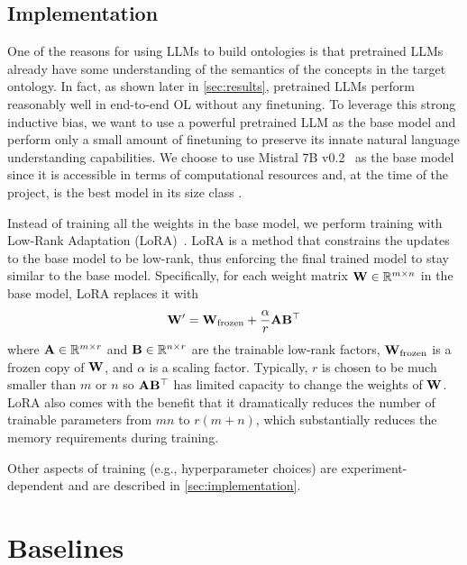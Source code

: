 \subsection{Implementation}

One of the reasons for using LLMs to build ontologies is that pretrained LLMs already have some understanding of the semantics of the concepts in the target ontology. In fact, as shown later in \cref{sec:results}, pretrained LLMs perform reasonably well in end-to-end OL without any finetuning. To leverage this strong inductive bias, we want to use a powerful pretrained LLM as the base model and perform only a small amount of finetuning to preserve its innate natural language understanding capabilities. We choose to use Mistral 7B v0.2~\cite{jiang2023mistral} as the base model since it is accessible in terms of computational resources and, at the time of the project, is the best model in its size class \cite{chiang2024chatbot}.

Instead of training all the weights in the base model, we perform training with Low-Rank Adaptation (LoRA)~\cite{hu2021lora}. LoRA is a method that constrains the updates to the base model to be low-rank, thus enforcing the final trained model to stay similar to the base model. Specifically, for each weight matrix $\mathbf{W} \in \mathbb{R}^{m \times n}$ in the base model, LoRA replaces it with
\[
    \mathbf{W}' = \mathbf{W}_{\text{frozen}} + \frac{\alpha}{r} \mathbf{A} \mathbf{B}^\top
\]
where $\mathbf{A} \in \mathbb{R}^{m \times r}$ and $\mathbf{B} \in \mathbb{R}^{n \times r}$ are the trainable low-rank factors, $\mathbf{W}_{\text{frozen}}$ is a frozen copy of $\mathbf{W}$, and $\alpha$ is a scaling factor. Typically, $r$ is chosen to be much smaller than $m$ or $n$ so $\mathbf{A}\mathbf{B}^\top$ has limited capacity to change the weights of $\mathbf{W}$. LoRA also comes with the benefit that it dramatically reduces the number of trainable parameters from $mn$ to $r(m + n)$, which substantially reduces the memory requirements during training.

Other aspects of training (e.g., hyperparameter choices) are experiment-dependent and are described in \cref{sec:implementation}.

\section{Baselines}  \label{sec:implementation:baselines}

